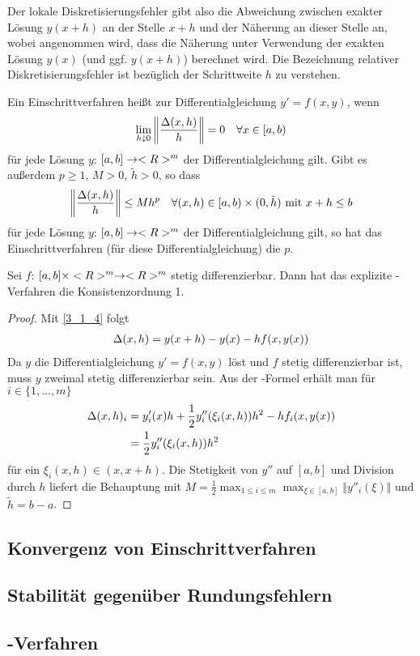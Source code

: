 Der lokale Diskretisierungsfehler gibt also die Abweichung zwischen exakter Lösung $y(x+h)$ an der Stelle $x+h$ und der Näherung an dieser Stelle an, wobei angenommen wird, dass die Näherung unter Verwendung der exakten Lösung $y(x)$ (und ggf. $y(x+h)$) berechnet wird. Die Bezeichnung relativer Diskretisierungsfehler ist bezüglich der Schrittweite $h$ zu verstehen.

\begin{definition}
	Ein Einschrittverfahren heißt  zur Differentialgleichung $y'=f(x,y)$, wenn
	\begin{align}
		\lim\limits_{h\downarrow 0} \left\Vert\frac{\Delta(x,h)}{h}\right\Vert =0\quad\forall x\in [a,b) \notag
	\end{align}
	für jede Lösung $y$: $[a,b]\to<R>^m$ der Differentialgleichung gilt. Gibt es außerdem $p\ge 1$, $M>0$, $\tilde{h}>0$, so dass
	\begin{align}
		\left\Vert\frac{\Delta(x,h)}{h}\right\Vert \le Mh^p\quad\forall (x,h)\in [a,b)\times (0,\tilde{h})\text{ mit } x+h\le b \notag
	\end{align}
	für jede Lösung $y$: $[a,b]\to<R>^m$ der Differentialgleichung gilt, so hat das Einschrittverfahren (für diese Differentialgleichung) die  $p$.
\end{definition}

\begin{proposition}
	Sei $f$: $[a,b]\times <R>^m\to<R>^m$ stetig differenzierbar. Dann hat das explizite -Verfahren die Konsistenzordnung 1.
\end{proposition}
\begin{proof}
	Mit \cref{3_1_4} folgt
	\begin{align}
		\Delta(x,h) = y(x+h) - y(x) - hf(x,y(x)) \notag
	\end{align}
	Da $y$ die Differentialgleichung $y'=f(x,y)$ löst und $f$ stetig differenzierbar ist, muss $y$ zweimal stetig differenzierbar sein. Aus der -Formel erhält man für $i\in\{1,...,m\}$
	\begin{align}
		\Delta(x,h)_i &= y'_i(x)h + \frac{1}{2}y''_i(\xi_i(x,h))h^2 - hf_i(x,y(x)) \notag \\
		&= \frac{1}{2} y''_i(\xi_i(x,h))h^2 \notag
	\end{align}
	für ein $\xi_i(x,h)\in (x,x+h)$. Die Stetigkeit von $y''$ auf $[a,b]$ und Division durch $h$ liefert die Behauptung mit $M=\frac{1}{2}\max_{1\le i\le m}\max_{\xi\in[a,b]}\Vert y''_i(\xi)\Vert$ und $\tilde{h}=b-a$.
\end{proof}

\subsection{Konvergenz von Einschrittverfahren}

\subsection{Stabilität gegenüber Rundungsfehlern}

\subsection{-Verfahren}
